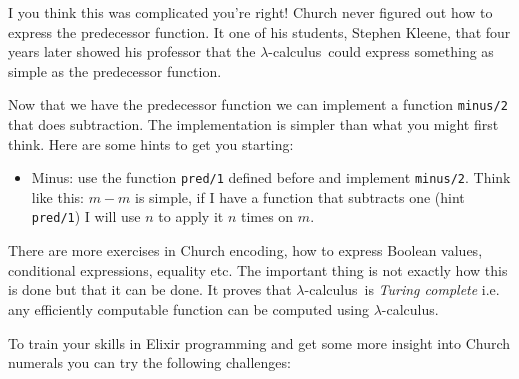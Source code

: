 \documentclass[a4paper,11pt]{article}
\newcommand{\lamc}[0]{$\lambda$-calculus}
\begin{document}
I you think this was complicated you're right! Church never figured
out how to express the predecessor function. It one of his students,
Stephen Kleene, that four years later showed his professor that the
\lamc\ could express something as simple as the predecessor function. 

Now that we have the predecessor function we can implement a function
{\tt minus/2} that does subtraction. The implementation is simpler
than what you might first think. Here are some hints to get you starting:


\begin{itemize}
\item Minus: use the function {\tt pred/1} defined before and
  implement {\tt minus/2}. Think like this: $m - m$ is simple, if I
  have a function that subtracts one (hint {\tt pred/1}) I will use
    $n$ to apply it $n$ times on $m$. 
\end{itemize}

There are more exercises in Church encoding, how to express Boolean
values, conditional expressions, equality etc. The important thing is
not exactly how this is done but that it can be done. It proves that
\lamc\ is {\em Turing complete} i.e. any efficiently computable
function can be computed using \lamc.

To train your skills in Elixir programming and get some
more insight into Church numerals you can try the following challenges:
\end{document}
